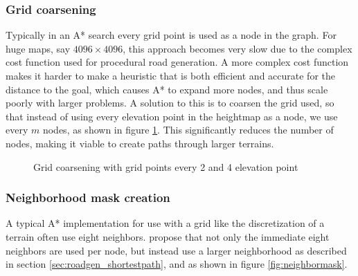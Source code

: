 \subsubsection{Grid coarsening}
Typically in an A* search every grid point is used as a node in the graph. For huge maps, say $4096\times 4096$, this approach becomes very slow due to the complex cost function used for procedural road generation. A more complex cost function makes it harder to make a heuristic that is both efficient and accurate for the distance to the goal, which causes A* to expand more nodes, and thus scale poorly with larger problems. A solution to this is to coarsen the grid used, so that instead of using every elevation point in the heightmap as a node, we use every $m$ nodes, as shown in figure \ref{fig:grid_coarsening}. This significantly reduces the number of nodes, making it viable to create paths through larger terrains.

\begin{figure}[ht]
\centering
{}
\qquad
{}
\caption{Grid coarsening with grid points every 2 and 4 elevation point}
\label{fig:grid_coarsening}
\end{figure}

\subsubsection{Neighborhood mask creation}
A typical A* implementation for use with a grid like the discretization of a terrain often use eight neighbors. \cite{roadgen} propose that not only the immediate eight neighbors are used per node, but instead use a larger neighborhood as described in section \ref{sec:roadgen_shortestpath}, and as shown in figure \ref{fig:neighbormask}. 

